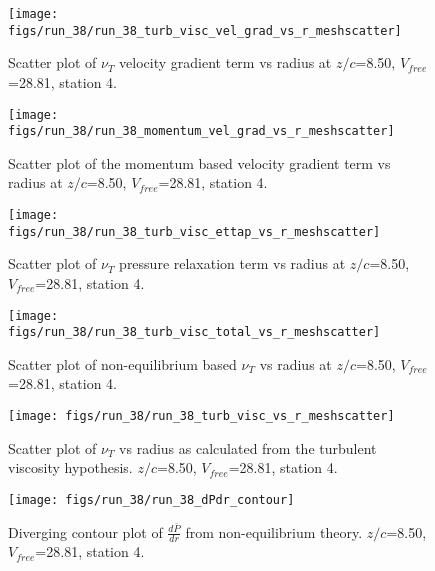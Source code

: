 \begin{figure}[H]
\centering
\texttt{[image: figs/run\_38/run\_38\_turb\_visc\_vel\_grad\_vs\_r\_meshscatter]}
\caption{Scatter plot of $\nu_T$ velocity gradient term vs radius at $z/c$=8.50, $V_{free}$=28.81, station 4.}
\end{figure}


\begin{figure}[H]
\centering
\texttt{[image: figs/run\_38/run\_38\_momentum\_vel\_grad\_vs\_r\_meshscatter]}
\caption{Scatter plot of the momentum based velocity gradient term vs radius at $z/c$=8.50, $V_{free}$=28.81, station 4.}
\end{figure}


\begin{figure}[H]
\centering
\texttt{[image: figs/run\_38/run\_38\_turb\_visc\_ettap\_vs\_r\_meshscatter]}
\caption{Scatter plot of $\nu_T$ pressure relaxation term vs radius at $z/c$=8.50, $V_{free}$=28.81, station 4.}
\end{figure}


\begin{figure}[H]
\centering
\texttt{[image: figs/run\_38/run\_38\_turb\_visc\_total\_vs\_r\_meshscatter]}
\caption{Scatter plot of non-equilibrium based $\nu_T$ vs radius at $z/c$=8.50, $V_{free}$=28.81, station 4.}
\end{figure}


\begin{figure}[H]
\centering
\texttt{[image: figs/run\_38/run\_38\_turb\_visc\_vs\_r\_meshscatter]}
\caption{Scatter plot of $\nu_T$ vs radius as calculated from the turbulent viscosity hypothesis. $z/c$=8.50, $V_{free}$=28.81, station 4.}
\end{figure}


\begin{figure}[H]
\centering
\texttt{[image: figs/run\_38/run\_38\_dPdr\_contour]}
\caption{Diverging contour plot of $\frac{d\bar{P}}{dr}$ from non-equilibrium theory. $z/c$=8.50, $V_{free}$=28.81, station 4.}
\end{figure}


